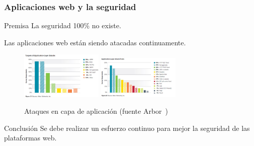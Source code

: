 \begin{frame}[shrink=20]
  \frametitle{Aplicaciones web y la seguridad}
  \begin{block}{Premisa}
     La seguridad 100\% no existe.
  \end{block}
  Las aplicaciones web están siendo atacadas continuamente.
  \begin{figure}
    \includegraphics[width=0.35\textwidth]{fig/application-attacks-2}%
    \includegraphics[width=0.35\textwidth]{fig/application-attacks-1}
    \label{fig:applicationattacks}
    \caption{\small{Ataques en capa de aplicación (fuente Arbor~\cite{articleArbor})}}
  \end{figure}
  \begin{alertblock}{Conclusión}
    Se debe realizar un esfuerzo continuo para mejor la seguridad de las plataformas web.
  \end{alertblock}
\end{frame}

